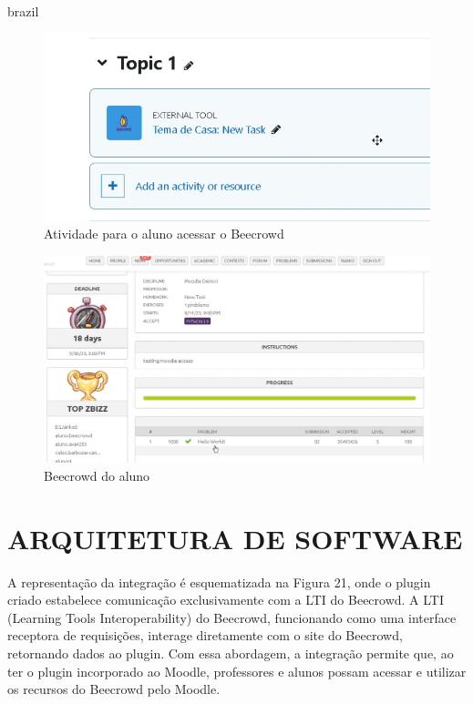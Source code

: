 \begin{otherlanguage*}{brazil}
\begin{figure}[H]
    \centering
            \caption{Atividade para o aluno acessar o Beecrowd}
            \label{fig:ModeloConceitual}
        \includegraphics[scale=0.4]{pictures/desenvolvimento/lti_tarefa.png}
\end{figure}

\begin{figure}[H]
    \centering
            \caption{Beecrowd do aluno}
            \label{fig:ModeloConceitual}
        \includegraphics[scale=0.4]{pictures/desenvolvimento/lti_beecrowd_aluno.png}
\end{figure}

\section{ARQUITETURA DE SOFTWARE}

A representação da integração é esquematizada na Figura 21, onde o plugin criado estabelece comunicação exclusivamente com a LTI do Beecrowd. A LTI (Learning Tools Interoperability) do Beecrowd, funcionando como uma interface receptora de requisições, interage diretamente com o site do Beecrowd, retornando dados ao plugin. Com essa abordagem, a integração permite que, ao ter o plugin incorporado ao Moodle, professores e alunos possam acessar e utilizar os recursos do Beecrowd pelo Moodle.


\end{otherlanguage*}

